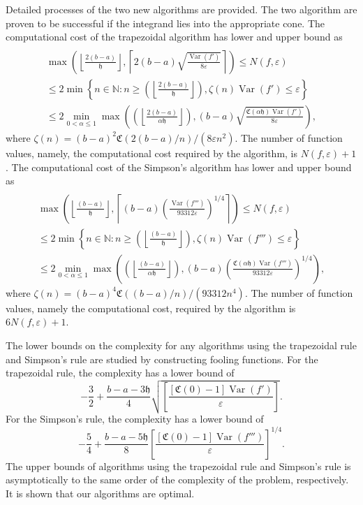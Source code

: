 \documentclass{iitthesis}
\DeclareMathOperator{\Var}{Var}
\theoremstyle{definition}
\theoremstyle{remark}
\begin{document}
Detailed processes of the two new algorithms are provided. The two algorithm are proven to be successful if the integrand lies into the appropriate cone. The computational cost of the trapezoidal algorithm has lower and upper bound as
\begin{multline*}\\
        \max\left(\left\lfloor\frac{2(b-a)}{\mathfrak{h}}\right\rfloor,\left\lceil2(b-a)\sqrt{\frac{\Var(f')}{8\varepsilon}}\right\rceil\right)\leq N(f,\varepsilon)\\ \leq 2\min\left\{n\in\mathbb{N}:n\geq\left(\left\lfloor\frac{2(b-a)}{\mathfrak{h}}\right\rfloor\right),\zeta(n)\Var(f')\leq\varepsilon\right\}\\ \leq 2\min_{0<\alpha\leq1}\max\left(\left(\left\lfloor\frac{2(b-a)}{\alpha\mathfrak{h}}\right\rfloor\right),(b-a)\sqrt{\frac{\mathfrak{C}(\alpha\mathfrak{h})\Var(f')}{8\varepsilon}}\right),
    \end{multline*}
    where $\zeta(n)=(b-a)^2\mathfrak{C}(2(b-a)/n)/(8\varepsilon n^2)$. The number of function values, namely, the computational cost required by the algorithm, is $N(f,\varepsilon)+1$.
    The computational cost of the Simpson's algorithm has lower and upper bound as
    \begin{multline*}\\
         \max\left(\left\lfloor\frac{(b-a)}{\mathfrak{h}}\right\rfloor,\left\lceil(b-a)\left(\frac{\Var(f''')}{93312\varepsilon}\right)^{1/4}\right\rceil\right)\leq N(f,\varepsilon)\\ \leq 2\min\left\{n\in\mathbb{N}:n\geq\left(\left\lfloor\frac{(b-a)}{\mathfrak{h}}\right\rfloor\right),\zeta(n)\Var(f''')\leq\varepsilon\right\}\\ \leq 2\min_{0<\alpha\leq1}\max\left(\left(\left\lfloor\frac{(b-a)}{\alpha\mathfrak{h}}\right\rfloor\right),(b-a)\left(\frac{\mathfrak{C}(\alpha\mathfrak{h})\Var(f''')}{93312\varepsilon}\right)^{1/4}\right),
    \end{multline*}
  where $\zeta(n)=(b-a)^4\mathfrak{C}((b-a)/n)/(93312n^4)$. The number of function values, namely the computational cost, required by the algorithm is $6N(f,\varepsilon)+1$.

The lower bounds on the complexity for any algorithms using the trapezoidal rule and Simpson's rule are studied by constructing fooling functions. For the trapezoidal rule, the complexity has a lower bound of
$$
     -\frac{3}{2}+\frac{b-a-3\mathfrak{h}}{4}\sqrt{\left[\frac{[\mathfrak{C}(0)-1]\Var( f')}{\varepsilon}\right]}.
$$
For the Simpson's rule, the complexity has a lower bound of
$$
     -\frac{5}{4}+\frac{b-a-5\mathfrak{h}}{8}\left[\frac{[\mathfrak{C}(0)-1]\Var( f''')}{\varepsilon}\right]^{1/4}.
$$
The upper bounds of algorithms using the trapezoidal rule and Simpson's rule is asymptotically to the same order of the complexity of the problem, respectively. It is shown that our algorithms are optimal.
\end{document}
